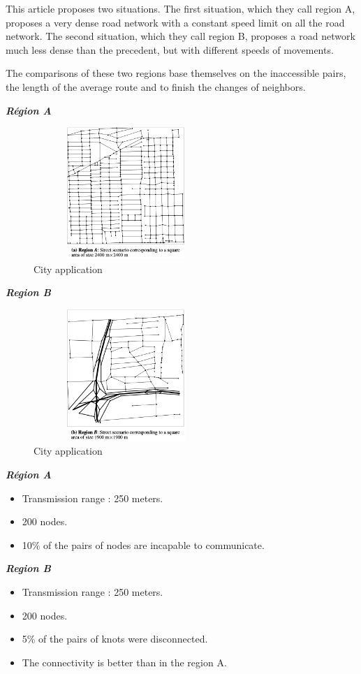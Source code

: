 This article proposes two situations.
The first situation, which they call region A, proposes a very dense road network with a constant speed limit on all the road network.
The second situation, which they call region B, proposes a road network much less dense than the precedent, but with different speeds of movements.

The comparisons of these two regions base themselves on the inaccessible pairs, the length of the average route and to finish the changes of neighbors.

\begin{multicols}{2}
\textit{\textbf{Région A}}
\begin{figure}[h]
\center
\includegraphics[width=7cm,height=50mm]{../images/cityA.png}
\caption{City application}
\end{figure}
\columnbreak
\textit{\textbf{Region B}}
\begin{figure}[h]
\center
\includegraphics[width=7cm,height=50mm]{../images/cityB.png}
\caption{City application}
\end{figure}
\end{multicols}


\begin{multicols}{2}
\textit{\textbf{Région A}}
\begin{itemize}[label=$\square$]
\item Transmission range : 250 meters.
\item 200 nodes.
\item 10\% of the pairs of nodes are incapable to communicate.
\end{itemize}
\columnbreak
\textit{\textbf{Region B}}
\begin{itemize}[label=$\square$]
\item Transmission range : 250 meters.
\item 200 nodes.
\item 5\% of the pairs of knots were disconnected.
\item The connectivity is better than in the region A.
\end{itemize}
\end{multicols}